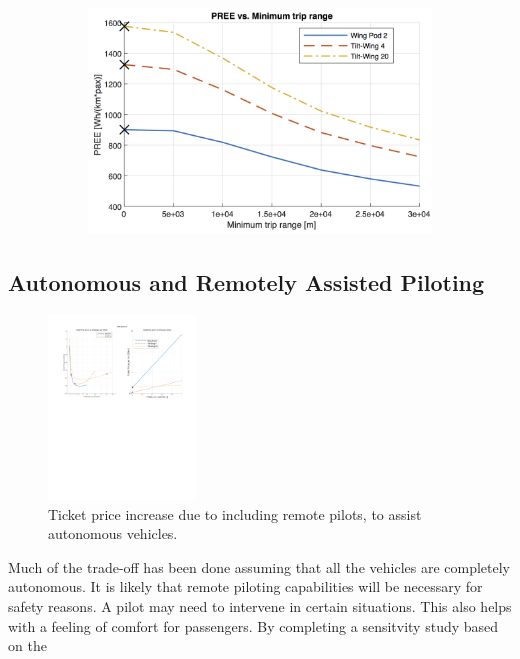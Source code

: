 \begin{figure}[H]
\begin{subfigure}[t]{0.33\textwidth}
    \centering
    \includegraphics[width=\textwidth]{Figures/report_PREE.png}
    \captionsetup{width=.8\linewidth}
    \caption{}
    \label{fig:sens9}
\end{subfigure}
\label{fig:sens789}
\end{figure}

\subsection{Autonomous and Remotely Assisted Piloting}

\begin{figure}
    \centering
    \includegraphics[width=0.35\textwidth]{Figures/autonomous_TPrice_perkm.png}
    \caption{Ticket price increase due to including remote pilots, to assist autonomous vehicles.}
    \label{fig:autocost}
\end{figure}

Much of the trade-off has been done assuming that all the vehicles are completely autonomous. It is likely that remote piloting capabilities will be necessary for safety reasons. A pilot may need to intervene in certain situations. This also helps with a feeling of comfort for passengers. By completing a sensitvity study based on the 
